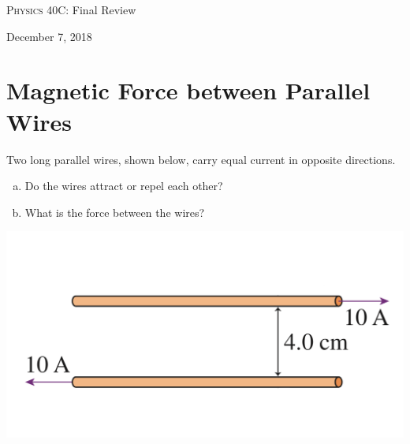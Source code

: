 \documentclass[12pt]{article}
\newcommand{\email}[1]{\texttt{\href{mailto:#1}{#1}}}
\begin{document}
\begin{center}

\Large{\textsc{Physics 40C:} Final Review}
\end{center}

\begin{center}
\large{December 7, 2018}	
\end{center}






\section{Magnetic Force between Parallel Wires}

Two long parallel wires, shown below, carry equal current in opposite directions.
\begin{enumerate}[(a)]
	\item Do the wires attract or repel each other? 
	\item What is the force between the wires?
\end{enumerate}

\begin{center}
\includegraphics[width=.6\linewidth]{W7_3}
\end{center}
\end{document}
